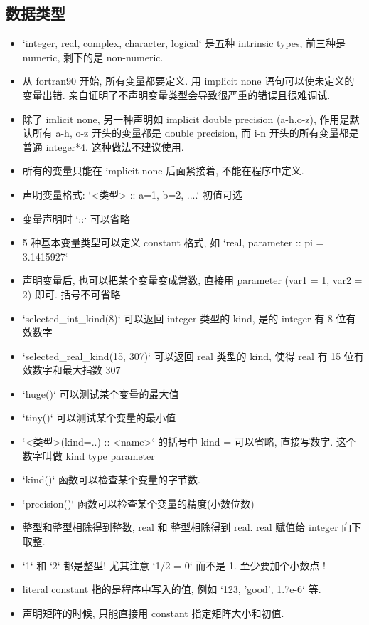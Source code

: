 \subsection{数据类型}
\begin{itemize}
\item `integer, real, complex, character, logical` 是五种 intrinsic types, 前三种是 numeric, 剩下的是 non-numeric.
\item 从 fortran90 开始, 所有变量都要定义. 用 implicit none 语句可以使未定义的变量出错. 亲自证明了不声明变量类型会导致很严重的错误且很难调试.
\item 除了 imlicit none, 另一种声明如 implicit double precision (a-h,o-z), 作用是默认所有 a-h, o-z 开头的变量都是 double precision, 而 i-n 开头的所有变量都是普通 integer*4. 这种做法不建议使用.
\item 所有的变量只能在 implicit none 后面紧接着, 不能在程序中定义.
\item 声明变量格式:  `<类型> :: a=1, b=2, ....`  初值可选
\item 变量声明时 `::` 可以省略
\item 5 种基本变量类型可以定义 constant 格式, 如  `real, parameter :: pi = 3.1415927`
\item 声明变量后, 也可以把某个变量变成常数, 直接用 parameter (var1 = 1, var2 = 2) 即可. 括号不可省略
\item `selected_int_kind(8)` 可以返回 integer 类型的 kind, 是的 integer 有 8 位有效数字
\item `selected_real_kind(15, 307)` 可以返回 real 类型的 kind, 使得 real 有 15 位有效数字和最大指数 307
\item `huge()` 可以测试某个变量的最大值
\item `tiny()` 可以测试某个变量的最小值
\item `<类型>(kind=..) :: <name>` 的括号中 kind = 可以省略, 直接写数字. 这个数字叫做 kind type parameter
\item `kind()` 函数可以检查某个变量的字节数.
\item `precision()` 函数可以检查某个变量的精度(小数位数)
\item 整型和整型相除得到整数, real 和 整型相除得到 real. real 赋值给 integer 向下取整.
\item `1` 和 `2` 都是整型! 尤其注意 `1/2 = 0` 而不是 1.   至少要加个小数点 !
\item literal constant 指的是程序中写入的值, 例如 `123, 'good', 1.7e-6` 等.
\item 声明矩阵的时候, 只能直接用 constant 指定矩阵大小和初值.
\end{itemize}

